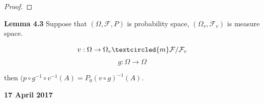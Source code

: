 \documentclass[11pt,fleqn]{book} %
\begin{document}
\begin{proof}
	
\end{proof}

\textbf{Lemma 4.3} Suppose that $(\Omega, \mathcal{F}, P)$ is probability space, $(\Omega_v, \mathcal{F}_v)$ is measure space.

		$$v: \Omega \rightarrow \Omega_v \textcircled{m} \mathcal{F}/\mathcal{F}_v $$
		$$g: \Omega \rightarrow \Omega $$

then $(p \circ g^{-1} \circ v^{-1}(A) = P_0 (v \circ g) ^{-1} (A)$. 

\textbf{17 April 2017}\\













\cleardoublepage
{}
\setlength{\columnsep}{0.75cm}

\end{document}

